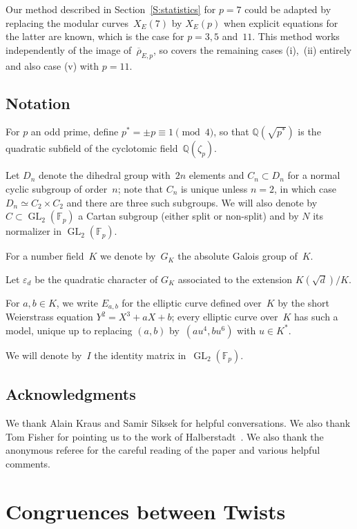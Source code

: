 \documentclass[twoside,leqno,symbols-for-thanks, draft]{rmi}
\numberwithin{equation}{section}
\newcommand{\Fp}{\mathbb{F}_p}
\newcommand{\Q}{\mathbb{Q}}
\newcommand{\rhobar}{{\overline{\rho}}}
\newcommand{\eps}{\varepsilon}
\newcommand{\GL}{\operatorname{GL}}
\theoremstyle{remark}
\begin{document}
Our method described in Section~\ref{S:statistics} for $p=7$ could be
adapted by replacing the modular curves~$X_E(7)$ by $X_E(p)$ when
explicit equations for the latter are known, which is the case for
$p=3,5$ and~$11$. This method works independently of the image
of~$\rhobar_{E,p}$, so covers the remaining cases (i),~(ii) entirely and also case (v) with $p=11$.

\subsection{Notation} \label{S:notation}
For $p$ an odd prime, define $p^*=\pm p\equiv1\pmod4$, so that
$\Q(\sqrt{p^*})$ is the quadratic subfield of the cyclotomic
field~$\Q(\zeta_p)$.

Let $D_{n}$ denote the dihedral group with~$2n$ elements and $C_n
\subset D_{n}$ for a normal cyclic subgroup of order~$n$; note that
$C_n$ is unique unless $n=2$, in which case $D_{n} \simeq C_2 \times
C_2$ and there are three such subgroups.  We will also denote by $C
\subset \GL_2(\Fp)$ a Cartan subgroup (either split or non-split) and
by $N$ its normalizer in $\GL_2(\Fp)$.

For a number field~$K$ we denote by~$G_K$ the absolute Galois group
of~$K$.

Let $\eps_d$ be the quadratic character of $G_K$ associated to the
extension $K(\sqrt{d})/K$.

For $a, b \in K$, we write $E_{a,b}$ for the elliptic
curve defined over~$K$ by the short Weierstrass equation
$Y^2=X^3+aX+b$; every elliptic curve over~$K$ has such a model, unique
up to replacing $(a,b)$ by~$(au^4,bu^6)$ with $u\in K^*$.

We will denote by~$I$ the identity matrix in~$\GL_2(\Fp)$.

\subsection{Acknowledgments} We thank Alain Kraus and Samir Siksek for
helpful conversations. We also thank Tom Fisher for pointing
us to the work of Halberstadt~\cite{Halberstadt-11nonsplit}. We also
thank the anonymous referee for the careful reading of the paper and
various helpful comments.

\section{Congruences between Twists}\label{S:cong-twist}
\end{document}
